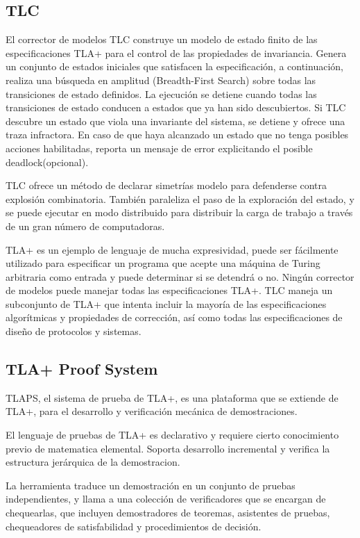 \documentclass[spanish]{llncs}
\begin{document}
  \subsection{TLC}
  El corrector de modelos TLC construye un modelo de estado finito de las especificaciones TLA+  para el control de las propiedades de invariancia. Genera un conjunto de estados 
  iniciales que satisfacen la especificación, a continuación, realiza una búsqueda en amplitud (Breadth-First Search) sobre todas las transiciones de estado definidos. 
  La ejecución se detiene cuando todas las transiciones de estado conducen a estados que ya han sido descubiertos. Si TLC descubre un estado que viola una invariante del sistema, 
  se detiene y ofrece una traza infractora. En caso de que haya alcanzado un estado que no tenga posibles acciones habilitadas, 
  reporta un mensaje de error explicitando el posible deadlock(opcional).
  
  TLC ofrece un método de declarar simetrías modelo para defenderse contra explosión combinatoria. También paraleliza el paso de la exploración del estado, 
  y se puede ejecutar en modo distribuido para distribuir la carga de trabajo a través de un gran número de computadoras.
  
  TLA+ es un ejemplo de lenguaje de mucha expresividad, puede ser fácilmente
  utilizado para especificar un programa que acepte una máquina de Turing arbitraria como entrada y puede determinar si se detendrá o no. 
  Ningún corrector de modelos puede manejar todas las especificaciones TLA+. TLC maneja un subconjunto de TLA+ que intenta incluir la mayoría de las especificaciones algorítmicas 
  y propiedades de corrección, así como todas las especificaciones de diseño de protocolos y sistemas.

  \subsection{TLA+ Proof System}
  TLAPS, el sistema de prueba de TLA+, es una plataforma que se extiende de TLA+, para el desarrollo y verificación mecánica de demostraciones. 
  
  El lenguaje de pruebas de TLA+ es declarativo y requiere cierto conocimiento previo de matematica elemental. Soporta desarrollo incremental y  verifica la estructura jerárquica 
  de la demostracion.
  
  La herramienta traduce un demostración en un conjunto de pruebas independientes, y llama a una colección de verificadores que se encargan de chequearlas, 
  que incluyen demostradores de teoremas, asistentes de pruebas, chequeadores de satisfabilidad y procedimientos de decisión.
  
\end{document}
